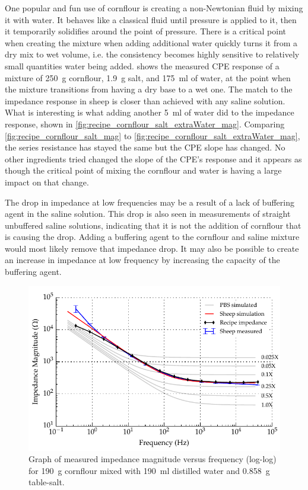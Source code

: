   One popular and fun use of cornflour is creating a non-Newtonian fluid by mixing it with water.
  It behaves like a classical fluid until pressure is applied to it, then it temporarily solidifies around the point of pressure.
  There is a critical point when creating the mixture when adding additional water quickly turns it from a dry mix to wet volume, i.e. the consistency becomes highly sensitive to relatively small quantities water being added.
   shows the measured CPE response of a mixture of \SI{250}{\gram} cornflour, \SI{1.9}{\gram} salt, and \SI{175}{\milli\litre} of water, at the point when the mixture transitions from having a dry base to a wet one.
  The match to the impedance response in sheep is closer than achieved with any saline solution.
  What is interesting is what adding another \SI{5}{\milli\litre} of water did to the impedance response, shown in \cref{fig:recipe_cornflour_salt_extraWater_mag}.
  Comparing \cref{fig:recipe_cornflour_salt_mag} to \cref{fig:recipe_cornflour_salt_extraWater_mag}, the series resistance has stayed the same but the CPE slope has changed.
  No other ingredients tried changed the slope of the CPE's response and it appears as though the critical point of mixing the cornflour and water is having a large impact on that change.

  The drop in impedance at low frequencies may be a result of a lack of buffering agent in the saline solution.
  This drop is also seen in measurements of straight unbuffered saline solutions, indicating that it is not the addition of cornflour that is causing the drop.
  Adding a buffering agent to the cornflour and saline mixture would most likely remove that impedance drop.
  It may also be possible to create an increase in impedance at low frequency by increasing the capacity of the buffering agent.

  \begin{figure}
      \centering
      \includegraphics[width=\textwidth]{content/pt2/graphics/run12_190ml-distilledWater_190g-cornflour_0g858-salt_ZVsF_graph_mag}
      \caption{\label{fig:recipe_cornflour_salt_extraWater_mag_improved}Graph of measured impedance magnitude versus frequency (log-log) for \SI{190}{\gram} cornflour mixed with \SI{190}{\milli\litre} distilled water and \SI{0.858}{\gram} table-salt.}
  \end{figure}

